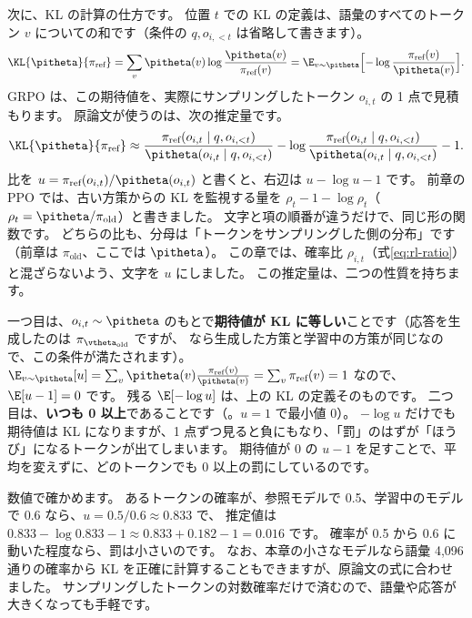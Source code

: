 次に、KL の計算の仕方です。
位置 $t$ での KL の定義は、語彙のすべてのトークン $v$ についての和です（条件の $q,o_{i,<t}$ は省略して書きます）。
\begin{equation*}
\KL{\pitheta}{\pi_{\text{ref}}}=\sum_{v}\pitheta(v)\log\frac{\pitheta(v)}{\pi_{\text{ref}}(v)}
=\E_{v\sim\pitheta}\Bigl[-\log\frac{\pi_{\text{ref}}(v)}{\pitheta(v)}\Bigr].
\end{equation*}
GRPO は、この期待値を、実際にサンプリングしたトークン $o_{i,t}$ の 1 点で見積もります。
原論文が使うのは、次の推定量です\cite{shao2024deepseekmath}。
\begin{equation}
\KL{\pitheta}{\pi_{\text{ref}}}\approx
\frac{\pi_{\text{ref}}(o_{i,t}\mid q,o_{i,<t})}{\pitheta(o_{i,t}\mid q,o_{i,<t})}
-\log\frac{\pi_{\text{ref}}(o_{i,t}\mid q,o_{i,<t})}{\pitheta(o_{i,t}\mid q,o_{i,<t})}-1.
\label{eq:rl-kl-k3}
\end{equation}
比を $u=\pi_{\text{ref}}(o_{i,t})/\pitheta(o_{i,t})$ と書くと、右辺は $u-\log u-1$ です。
前章の PPO では、古い方策からの KL を監視する量を $\rho_t-1-\log\rho_t$（$\rho_t=\pitheta/\pi_{\text{old}}$）と書きました。
文字と項の順番が違うだけで、同じ形の関数です。
どちらの比も、分母は「トークンをサンプリングした側の分布」です（前章は $\pi_{\text{old}}$、ここでは $\pitheta$）。
この章では、確率比 $\rho_{i,t}$（式\eqref{eq:rl-ratio}）と混ざらないよう、文字を $u$ にしました。
この推定量は、二つの性質を持ちます。

一つ目は、$o_{i,t}\sim\pitheta$ のもとで\textbf{期待値が KL に等しい}ことです（応答を生成したのは $\pi_{\vtheta_{\text{old}}}$ ですが、 なら生成した方策と学習中の方策が同じなので、この条件が満たされます）。
$\E_{v\sim\pitheta}[u]=\sum_v\pitheta(v)\frac{\pi_{\text{ref}}(v)}{\pitheta(v)}=\sum_v\pi_{\text{ref}}(v)=1$ なので、$\E[u-1]=0$ です。
残る $\E[-\log u]$ は、上の KL の定義そのものです。
二つ目は、\textbf{いつも 0 以上}であることです（。$u=1$ で最小値 0）。
$-\log u$ だけでも期待値は KL になりますが、1 点ずつ見ると負にもなり、「罰」のはずが「ほうび」になるトークンが出てしまいます。
期待値が 0 の $u-1$ を足すことで、平均を変えずに、どのトークンでも 0 以上の罰にしているのです。

数値で確かめます。
あるトークンの確率が、参照モデルで 0.5、学習中のモデルで 0.6 なら、$u=0.5/0.6\approx0.833$ で、
推定値は $0.833-\log0.833-1\approx0.833+0.182-1=0.016$ です。
確率が 0.5 から 0.6 に動いた程度なら、罰は小さいのです。
なお、本章の小さなモデルなら語彙 4,096 通りの確率から KL を正確に計算することもできますが、原論文の式に合わせました。
サンプリングしたトークンの対数確率だけで済むので、語彙や応答が大きくなっても手軽です。


